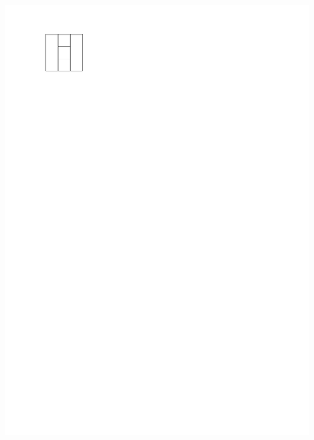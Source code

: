 \documentclass[a4paper]{article}
\begin{document}
\includegraphics[scale=1]{./introduction/img/areaunivDual.pdf}
\clearpage%
\end{document}
